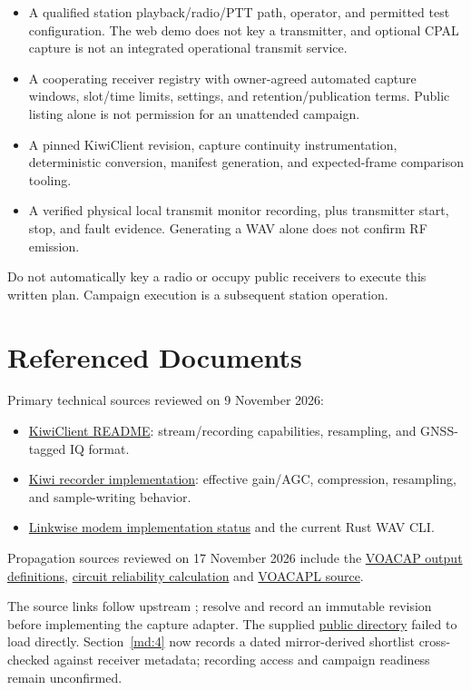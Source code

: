 \documentclass[11pt,a4paper]{article}
\begin{document}
\begin{itemize}
\item A qualified station playback/radio/PTT path, operator, and permitted test configuration. The web demo does not key a transmitter, and optional CPAL capture is not an integrated operational transmit service.
\item A cooperating receiver registry with owner-agreed automated capture windows, slot/time limits, settings, and retention/publication terms. Public listing alone is not permission for an unattended campaign.
\item A pinned KiwiClient revision, capture continuity instrumentation, deterministic conversion, manifest generation, and expected-frame comparison tooling.
\item A verified physical local transmit monitor recording, plus transmitter start, stop, and fault evidence. Generating a WAV alone does not confirm RF emission.
\end{itemize}
Do not automatically key a radio or occupy public receivers to execute this written plan. Campaign execution is a subsequent station operation.


\section{Referenced Documents}
\label{tp:references}

Primary technical sources reviewed on 9 November 2026:

\begin{itemize}
\item \href{https://github.com/jks-prv/kiwiclient/blob/master/README.md}{KiwiClient README}: stream/recording capabilities, resampling, and GNSS-tagged IQ format.
\item \href{https://github.com/jks-prv/kiwiclient/blob/master/kiwirecorder.py}{Kiwi recorder implementation}: effective gain/AGC, compression, resampling, and sample-writing behavior.
\item \href{../../../rust/docs/modem.md}{Linkwise modem implementation status} and the current Rust WAV CLI.
\end{itemize}
Propagation sources reviewed on 17 November 2026 include the \href{https://www.voacap.com/2023/voacap-windows-output.html}{VOACAP output definitions}, \href{https://www.voacap.com/2023/understanding/rel.html}{circuit reliability calculation} and \href{https://github.com/jawatson/voacapl}{VOACAPL source}.

The source links follow upstream ; resolve and record an immutable revision before implementing the capture adapter. The supplied \href{http://kiwisdr.com/public/}{public directory} failed to load directly. Section~\ref{md:4} now records a dated mirror-derived shortlist cross-checked against receiver metadata; recording access and campaign readiness remain unconfirmed.
\end{document}
